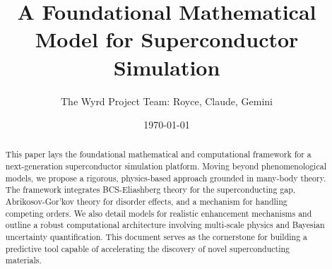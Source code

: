 \documentclass{article}
\title{\bfseries A Foundational Mathematical Model for Superconductor Simulation}
\author{The Wyrd Project Team: Royce, Claude, Gemini}
\date{\today}
\begin{document}
\maketitle

\begin{abstract}
This paper lays the foundational mathematical and computational framework for a next-generation superconductor simulation platform. Moving beyond phenomenological models, we propose a rigorous, physics-based approach grounded in many-body theory. The framework integrates BCS-Eliashberg theory for the superconducting gap, Abrikosov-Gor'kov theory for disorder effects, and a mechanism for handling competing orders. We also detail models for realistic enhancement mechanisms and outline a robust computational architecture involving multi-scale physics and Bayesian uncertainty quantification. This document serves as the cornerstone for building a predictive tool capable of accelerating the discovery of novel superconducting materials.
\end{abstract}

\tableofcontents
\newpage










\end{document}
